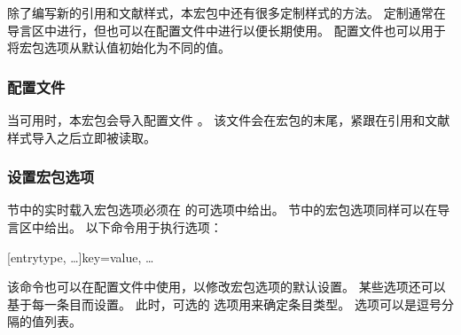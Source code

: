 
除了编写新的引用和文献样式，本宏包中还有很多定制样式的方法。
定制通常在导言区中进行，但也可以在配置文件中进行以便长期使用。
配置文件也可以用于将宏包选项从默认值初始化为不同的值。

\subsubsection{配置文件}%
\label{use:cfg:cfg}


当可用时，本宏包会导入配置文件 。
该文件会在宏包的末尾，紧跟在引用和文献样式导入之后立即被读取。

\subsubsection{设置宏包选项}%
\label{use:cfg:opt}


 节中的实时载入宏包选项必须在  的可选项中给出。
 节中的宏包选项同样可以在导言区中给出。
以下命令用于执行选项：

\begin{ltxsyntax}

[entrytype, \dots]{key=value, \dots}


该命令也可以在配置文件中使用，以修改宏包选项的默认设置。
某些选项还可以基于每一条目而设置。
此时，可选的  选项用来确定条目类型。
 选项可以是逗号分隔的值列表。

\end{ltxsyntax}


